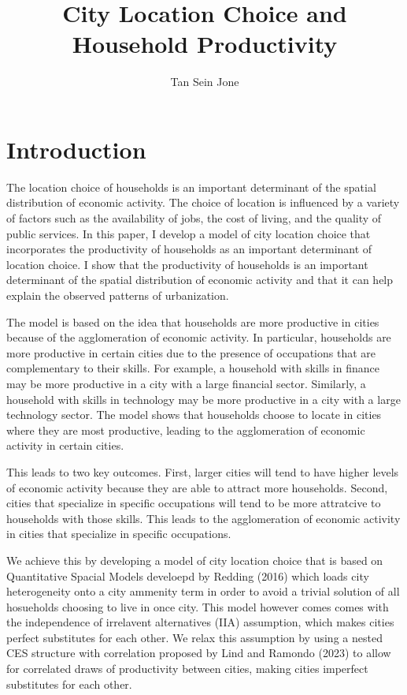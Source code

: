 \documentclass[10pt]{article}
\title{City Location Choice and Household Productivity}
\author{Tan Sein Jone}
\date{}
\begin{document}
\doublespacing
\maketitle

\section{Introduction}

The location choice of households is an important determinant of the spatial distribution of economic activity. The choice of location is influenced by a variety of factors such as the availability of jobs, the cost of living, and the quality of public services. In this paper, I develop a model of city location choice that incorporates the productivity of households as an important determinant of location choice. I show that the productivity of households is an important determinant of the spatial distribution of economic activity and that it can help explain the observed patterns of urbanization.

The model is based on the idea that households are more productive in cities because of the agglomeration of economic activity. In particular, households are more productive in certain cities due to the presence of occupations that are complementary to their skills. For example, a household with skills in finance may be more productive in a city with a large financial sector. Similarly, a household with skills in technology may be more productive in a city with a large technology sector. The model shows that households choose to locate in cities where they are most productive, leading to the agglomeration of economic activity in certain cities.

This leads to two key outcomes. First, larger cities will tend to have higher levels of economic activity because they are able to attract more households. Second, cities that specialize in specific occupations will tend to be more attratcive to households with those skills. This leads to the agglomeration of economic activity in cities that specialize in specific occupations.

We achieve this by developing a model of city location choice that is based on Quantitative Spacial Models develoepd by Redding (2016) which loads city heterogeneity onto a city ammenity term in order to avoid a trivial solution of all hosueholds choosing to live in once city. This model however comes comes with the independence of irrelavent alternatives (IIA) assumption, which makes cities perfect substitutes for each other. We relax this assumption by using a nested CES structure with correlation proposed by Lind and Ramondo (2023) to allow for correlated draws of productivity between cities, making cities imperfect substitutes for each other.
\end{document}
